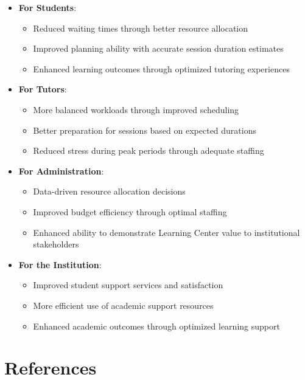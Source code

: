\documentclass[12pt,letterpaper]{article}
\begin{document}
\begin{itemize}
    \item \textbf{For Students}:
    \begin{itemize}
        \item Reduced waiting times through better resource allocation
        \item Improved planning ability with accurate session duration estimates
        \item Enhanced learning outcomes through optimized tutoring experiences
    \end{itemize}
    
    \item \textbf{For Tutors}:
    \begin{itemize}
        \item More balanced workloads through improved scheduling
        \item Better preparation for sessions based on expected durations
        \item Reduced stress during peak periods through adequate staffing
    \end{itemize}
    
    \item \textbf{For Administration}:
    \begin{itemize}
        \item Data-driven resource allocation decisions
        \item Improved budget efficiency through optimal staffing
        \item Enhanced ability to demonstrate Learning Center value to institutional stakeholders
    \end{itemize}
    
    \item \textbf{For the Institution}:
    \begin{itemize}
        \item Improved student support services and satisfaction
        \item More efficient use of academic support resources
        \item Enhanced academic outcomes through optimized learning support
    \end{itemize}
\end{itemize}

\section{References}
\end{document}
